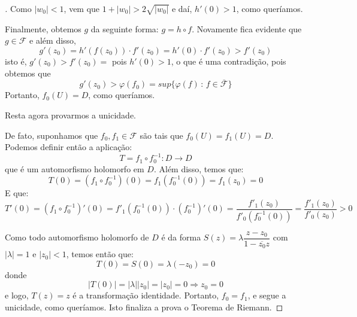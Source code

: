 \begin{proof}[]
Como $|w_0|<1$, vem que $1+|w_0| > 2\sqrt{|w_0|}$ e daí, $h'(0) > 1$, como queríamos.

Finalmente, obtemos $g$ da seguinte forma: $g=h\circ f$. Novamente fica evidente que $g\in\mathcal{F}$ e além disso, $$g'(z_0) = h'(f(z_0))\cdot f'(z_0) = h'(0)\cdot f'(z_0) > f'(z_0)$$ isto é, $g'(z_0)> f'(z_0) = $ pois $h'(0)>1$, o que é uma contradição, pois obtemos que $$g'(z_0) > \varphi(f_0) = sup{\{\varphi(f)\,:\,f\in\overline{\mathcal{F}}\}}$$
Portanto, $f_0(U) = D$, como queríamos.

Resta agora provarmos a unicidade.

De fato, suponhamos que $f_0,f_1\in\mathcal{F}$ são tais que $f_0(U) = f_1(U) = D$. Podemos definir então a aplicação: $$T = f_1\circ f_0^{-1}\colon D\longrightarrow D$$
que é um automorfismo holomorfo em $D$. Além disso, temos que: $$T(0) = (f_1\circ f_0^{-1})(0) = f_1(f_0^{-1}(0)) = f_1(z_0) = 0$$ E que: $$T'(0) = (f_1\circ f_0^{-1})'(0) = f'_1(f_0^{-1}(0))\cdot (f_0^{-1})'(0)=\dfrac{f'_1(z_0)}{f'_0(f_0^{-1}(0))} = \dfrac{f'_1(z_0)}{f'_0(z_0)}>0$$

Como todo automorfismo holomorfo de $D$ é da forma $S(z) = \lambda\dfrac{z-z_0}{1-\overline{z_0}z}$ com $|\lambda|=1$ e $|z_0|<1$, temos então que: $$T(0) = S(0) = \lambda(-z_0) = 0$$ donde $$|T(0)| = |\lambda||z_0|=|z_0| = 0\Longrightarrow z_0 = 0$$ e logo, $T(z) = z$ é a transformação identidade. Portanto, $f_0 = f_1$, e segue a unicidade, como queríamos.
Isto finaliza a prova o Teorema de Riemann.


\end{proof}
